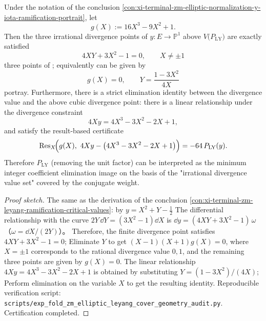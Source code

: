 \begin{conclusion}\label{con:xi-terminal-zm-leyang-branch-elimination-origin-y-iota}
Under the notation of the conclusion \ref{con:xi-terminal-zm-elliptic-normalization-y-iota-ramification-portrait}, let
\[
g(X):=16X^{3}-9X^{2}+1.
\]
Then the three irrational divergence points of \(y:E\to\mathbb P^{1}\) above \(V\!\bigl(P_{\mathrm{LY}}\bigr)\) are exactly satisfied
\[
4XY+3X^{2}-1=0,\qquad X\neq \pm 1
\]
three points of ; equivalently can be given by
\[
g(X)=0,\qquad Y=\frac{1-3X^{2}}{4X}
\]
portray.
Furthermore, there is a strict elimination identity between the divergence value and the above cubic divergence point: there is a linear relationship under the divergence constraint
\[
4Xy=4X^{3}-3X^{2}-2X+1,
\]
and satisfy the result-based certificate
\[
\mathrm{Res}_{X}\!\Bigl(g(X),\ 4Xy-\bigl(4X^{3}-3X^{2}-2X+1\bigr)\Bigr)=-64\,P_{\mathrm{LY}}(y).
\]
Therefore \(P_{\mathrm{LY}}\) (removing the unit factor) can be interpreted as the minimum integer coefficient elimination image on the basis of the "irrational divergence value set" covered by the conjugate weight.
\end{conclusion}
\begin{proof}[Proof sketch]
The same as the derivation of the conclusion \ref{con:xi-terminal-zm-leyang-ramification-critical-values}: by
\(
y=X^{2}+Y-\tfrac12
\)
The differential relationship with the curve \(2Y\,\dd Y=(3X^{2}-1)\dd X\) is
\(
\dd y=(4XY+3X^{2}-1)\,\omega
\)（\(\omega=\dd X/(2Y)\)）。
Therefore, the finite divergence point satisfies \(4XY+3X^{2}-1=0\);
Eliminate \(Y\) to get
\(
(X-1)(X+1)g(X)=0
\), where \(X=\pm 1\) corresponds to the rational divergence value \(0,1\), and the remaining three points are given by \(g(X)=0\).
The linear relationship \(4Xy=4X^{3}-3X^{2}-2X+1\) is obtained by substituting \(Y=(1-3X^{2})/(4X)\);
Perform elimination on the variable \(X\) to get the resulting identity.
Reproducible verification script: \texttt{scripts/exp\_fold\_zm\_elliptic\_leyang\_cover\_geometry\_audit.py}. Certification completed.
\end{proof}

